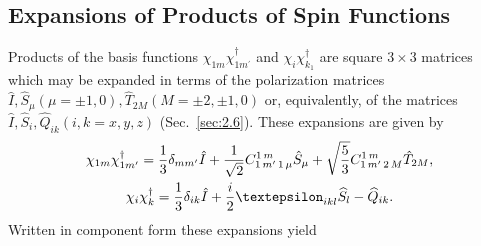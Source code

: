 \subsection{Expansions of Products of Spin Functions}\label{sec:6.3.2}
Products of the basis functions $\chi_{1 m} \chi_{1 m^{\prime}}^{\dagger}$ and $\chi_{i} \chi_{k_{1}}^{\dagger}$ are square $3 \times 3$ matrices which may be expanded in terms of the polarization matrices $\widehat{I}, \widehat{S}_{\mu}(\mu= \pm 1,0), \widehat{T}_{2 M}(M= \pm 2, \pm 1,0)$ or, equivalently, of the matrices $\widehat{I}, \widehat{S}_{i}, \widehat{Q}_{i k}(i, k=x, y, z)$ (Sec.~\ref{sec:2.6}). These expansions are given by
\begin{gather}
\chi_{1 m} \chi_{1 m^{\prime}}^{\dagger}=\frac{1}{3} \delta_{m m^{\prime}} \hat{I}+\frac{1}{\sqrt{2}} \clebsch{1}{m^{\prime}}{1}{\mu}{1}{m} \hat{S}_{\mu}+\sqrt{\frac{5}{3}} \clebsch{1}{m^{\prime}}{2}{M}{1}{m} \hat{T}_{2 M}, \label{eq:6:3:20}\\
\chi_{i} \chi_{k}^{\dagger}=\frac{1}{3} \delta_{i k} \hat{I}+\frac{i}{2} \varepsilon_{i k l} \widehat{S}_{l}-\widehat{Q}_{i k} . \label{eq:6:3:21}
\end{gather}
Written in component form these expansions yield
